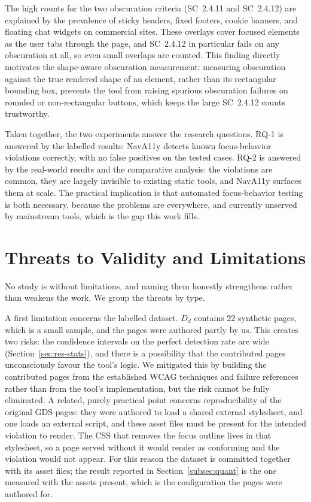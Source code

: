 The high counts for the two obscuration criteria (SC~2.4.11 and SC~2.4.12) are explained by
the prevalence of sticky headers, fixed footers, cookie banners, and floating chat widgets
on commercial sites. These overlays cover focused elements as the user tabs through the
page, and SC~2.4.12 in particular fails on any obscuration at all, so even small overlaps
are counted. This finding directly motivates the shape-aware obscuration measurement:
measuring obscuration against the true rendered shape of an element, rather than its
rectangular bounding box, prevents the tool from raising spurious obscuration failures on
rounded or non-rectangular buttons, which keeps the large SC~2.4.12 counts trustworthy.

Taken together, the two experiments answer the research questions. RQ-1 is answered by the
labelled results: NavA11y detects known focus-behavior violations correctly, with no false
positives on the tested cases. RQ-2 is answered by the real-world results and the
comparative analysis: the violations are common, they are largely invisible to existing
static tools, and NavA11y surfaces them at scale. The practical implication is that
automated focus-behavior testing is both necessary, because the problems are everywhere, and
currently unserved by mainstream tools, which is the gap this work fills.

\section{Threats to Validity and Limitations}
\label{sec:res-threats}

No study is without limitations, and naming them honestly strengthens rather than weakens
the work. We group the threats by type.

A first limitation concerns the labelled dataset. $D_d$ contains 22 synthetic pages, which
is a small sample, and the pages were authored partly by us. This creates two risks: the
confidence intervals on the perfect detection rate are wide
(Section~\ref{sec:res-stats}), and there is a possibility that the contributed pages
unconsciously favour the tool's logic. We mitigated this by building the contributed pages
from the established WCAG techniques and failure references rather than from the tool's
implementation, but the risk cannot be fully eliminated. A related, purely practical point
concerns reproducibility of the original GDS pages: they were authored to load a shared
external stylesheet, and one loads an external script, and these asset files must be present
for the intended violation to render. The CSS that removes the focus outline lives in that
stylesheet, so a page served without it would render as conforming and the violation would
not appear. For this reason the dataset is committed together with its asset files; the
result reported in Section~\ref{subsec:quant} is the one measured with the assets present,
which is the configuration the pages were authored for.

